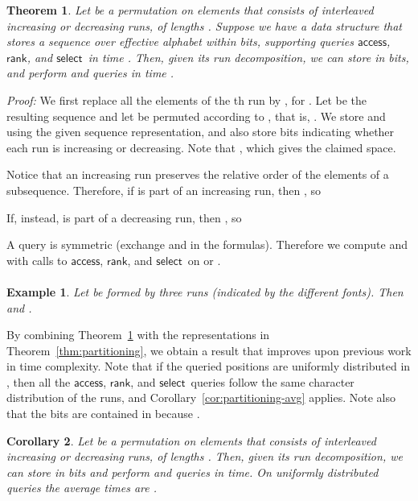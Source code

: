 \documentclass[11pt]{article}
\newtheorem{theorem}{Theorem}
\newtheorem{corollary}[theorem]{Corollary}
\newenvironment{proof}{\textit{Proof:}}{\hfill \paragraph{} }
\newtheorem{example}{Example}
\newcommand{\access}
    {\ensuremath{\mathsf{access}}}
\newcommand{\rank}
    {\ensuremath{\mathsf{rank}}}
\newcommand{\select}
    {\ensuremath{\mathsf{select}}}
\begin{document}
\begin{table}[t]
{\begin{tabular}
\begin{theorem} \label{thm:runs}
  Let  be a permutation on  elements that consists of 
  interleaved increasing or decreasing runs, of lengths .
  Suppose we have a data structure that stores a sequence 
  over effective alphabet  within  bits,
  supporting queries \access, \rank, and \select\ in time .
Then, given its run decomposition, we can store  in 
   bits,
  and perform  and  queries in time .
\end{theorem}

\begin{proof}
We first replace all the elements of the th run by , for .
Let  be the resulting sequence and let  be  permuted according to 
, that is, .
We store  and  using the given sequence representation, and also store 
 bits indicating whether each run is increasing or decreasing. Note that
, which gives the claimed space.

Notice that an increasing run preserves the relative order of the elements of
a subsequence. Therefore, if  is part of an increasing run, then 
, so

If, instead,  is part of a decreasing run, then , so

A  query is symmetric (exchange  and  in the formulas).  
Therefore we compute  and  with  calls to \access,
\rank, and \select\ on  or .
\end{proof}



\begin{example}
Let  be formed by three runs (indicated by
the different fonts). Then  and 
.
\end{example}

By combining Theorem~\ref{thm:runs} with the representations in 
Theorem~\ref{thm:partitioning}, we obtain a result that improves upon previous 
work \cite{BN09,BN11} in time complexity. Note that if the queried positions 
are uniformly distributed in , then all the \access, \rank, and
\select\ queries follow the same character distribution of the runs, and
Corollary~\ref{cor:partitioning-avg} applies.
Note also that the  bits are contained in  because
.

\begin{corollary} \label{cor:runs}
  Let  be a permutation on  elements that consists of 
  interleaved increasing or decreasing runs, of lengths .
Then, given its run decomposition, we can store  in 
   bits and perform  and  queries in
   time.
  On uniformly distributed queries the average times are
  .
\end{corollary}


\end{tabular}}
\end{table}
\end{document}
